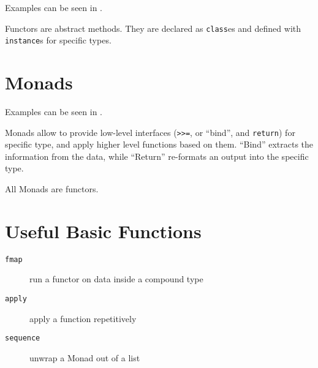 \documentclass[a4paper]{article}
\begin{document}
Examples can be seen in .

Functors are abstract methods. They are declared as \verb_class_es and defined
with \verb_instance_s for specific types.

\section{Monads}

Examples can be seen in .

Monads allow to provide low-level interfaces (\verb_>>=_, or ``bind'', and \verb_return_)
for specific type, and apply higher level functions based on them. ``Bind''
extracts the information from the data, while ``Return'' re-formats an output
into the specific type.

All Monads are functors.


\section{Useful Basic Functions}

\begin{description}
  \item[\texttt{fmap}] run a functor on data inside a compound type
  \item[\texttt{apply}] apply a function repetitively
  \item[\texttt{sequence}] unwrap a Monad out of a list
\end{description}
\end{document}
